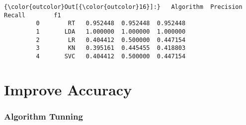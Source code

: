 \documentclass[11pt]{article}
\begin{document}
\begin{Verbatim}[commandchars=\\\{\}]
{\color{outcolor}Out[{\color{outcolor}16}]:}   Algorithm  Precision    Recall        f1
         0        RT   0.952448  0.952448  0.952448
         1       LDA   1.000000  1.000000  1.000000
         2        LR   0.404412  0.500000  0.447154
         3        KN   0.395161  0.445455  0.418803
         4       SVC   0.404412  0.500000  0.447154
\end{Verbatim}
            
    \section{Improve Accuracy}\label{improve-accuracy}

    \subsubsection{Algorithm Tunning}\label{algorithm-tunning}
\end{document}
